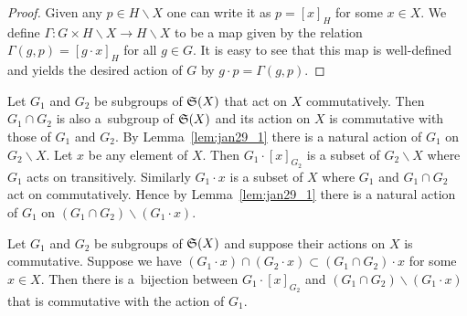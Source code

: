 \documentclass[pdftex]{sigma}
\begin{document}
\begin{proof}
Given any $p \in H \backslash X$ one can write it as $p = [x]_H$ for some $x \in X$.
We def\/ine $\varGamma : G \times H \backslash X \rightarrow H \backslash X$ to be a map given
by the relation $\varGamma (g,  p) = [g \cdot x]_H$ for all $g \in G$.
It is easy to see that this map is well-def\/ined and yields the desired action of $G$ by $g \cdot p = \varGamma (g,  p)$.
\end{proof}
Let $G_1$ and $G_2$ be subgroups of ${\frak S}(X)$ that act on $X$ commutatively.
Then $G_1 \cap G_2$ is also a~subgroup of ${\frak S}(X)$
and its action on $X$ is commutative with those of $G_1$ and $G_2$.
By Lemma~\ref{lem:jan29_1} there is a natural action of $G_1$ on $G_2 \backslash X$.
Let $x$ be any element of $X$.
{Then $G_1 \cdot [x]_{G_2}$ is a subset of $G_2 \backslash X$ where
$G_1$ acts on transitively.
Similarly $G_1 \cdot x$ is a subset of $X$ where $G_1$ and $G_1 \cap G_2$ act on commutatively.}
Hence by Lemma~\ref{lem:jan29_1}  there is a natural action of $G_1$ on
$(G_1 \cap G_2) \backslash (G_1 \cdot x)$.
\begin{proposition}\label{prop:jan29_3}
Let $G_1$ and $G_2$ be subgroups of ${\frak S}(X)$ and suppose their actions on $X$ is commutative.
Suppose we have $(G_1 \cdot x) \cap (G_2 \cdot x) \subset (G_1 \cap G_2) \cdot x$ for some $x \in X$.
Then there is a~bijection between $G_1 \cdot [x]_{G_2}$ and $(G_1 \cap G_2) \backslash (G_1 \cdot x)$
that is commutative with the action of $G_1$.
\end{proposition}
\end{document}
